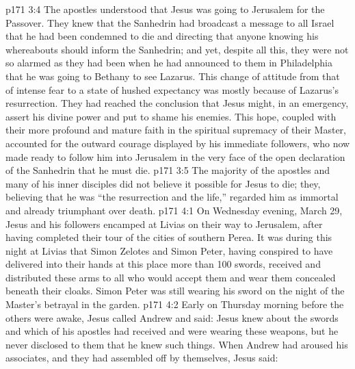 \vs p171 3:4 The apostles understood that Jesus was going to Jerusalem for the Passover. They knew that the Sanhedrin had broadcast a message to all Israel that he had been condemned to die and directing that anyone knowing his whereabouts should inform the Sanhedrin; and yet, despite all this, they were not so alarmed as they had been when he had announced to them in Philadelphia that he was going to Bethany to see Lazarus. This change of attitude from that of intense fear to a state of hushed expectancy was mostly because of Lazarus’s resurrection. They had reached the conclusion that Jesus might, in an emergency, assert his divine power and put to shame his enemies. This hope, coupled with their more profound and mature faith in the spiritual supremacy of their Master, accounted for the outward courage displayed by his immediate followers, who now made ready to follow him into Jerusalem in the very face of the open declaration of the Sanhedrin that he must die.
\vs p171 3:5 The majority of the apostles and many of his inner disciples did not believe it possible for Jesus to die; they, believing that he was “the resurrection and the life,” regarded him as immortal and already triumphant over death.
\vs p171 4:1 On Wednesday evening, March 29, Jesus and his followers encamped at Livias on their way to Jerusalem, after having completed their tour of the cities of southern Perea. It was during this night at Livias that Simon Zelotes and Simon Peter, having conspired to have delivered into their hands at this place more than 100 swords, received and distributed these arms to all who would accept them and wear them concealed beneath their cloaks. Simon Peter was still wearing his sword on the night of the Master’s betrayal in the garden.
\vs p171 4:2 Early on Thursday morning before the others were awake, Jesus called Andrew and said:  Jesus knew about the swords and which of his apostles had received and were wearing these weapons, but he never disclosed to them that he knew such things. When Andrew had aroused his associates, and they had assembled off by themselves, Jesus said: 
